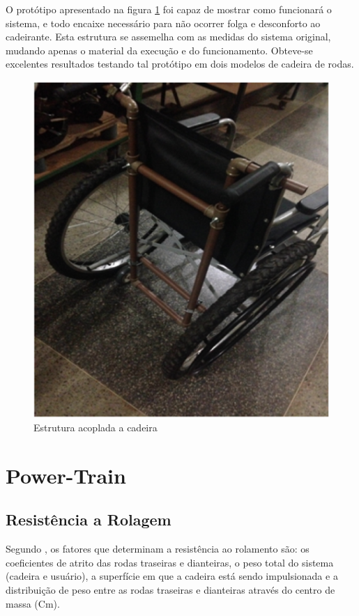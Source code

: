 O protótipo apresentado na figura \ref{fig:estr_prototipo} foi capaz de mostrar como funcionará o sistema, e todo encaixe necessário para não ocorrer folga e desconforto ao cadeirante. Esta estrutura se assemelha com as medidas do sistema original, mudando apenas o material da execução e do funcionamento. Obteve-se excelentes resultados testando tal protótipo em dois modelos de cadeira de rodas.

\begin{figure}[!htb]
\centering
\includegraphics[keepaspectratio=true,scale=0.7]{figuras/resultados/estr_prototipo}
\caption{Estrutura acoplada a cadeira}
\label{fig:estr_prototipo}
\end{figure}

\section{Power-Train}

\subsection[Resistência a Rolagem]{Resistência a Rolagem}
Segundo \cite{propulsao_cadeira}, os fatores que determinam a resistência ao rolamento são: os coeficientes de atrito das rodas traseiras e dianteiras, o peso total do sistema (cadeira e usuário), a superfície em que a cadeira está sendo impulsionada e a distribuição de peso entre as rodas traseiras e dianteiras através do centro de massa (Cm).

